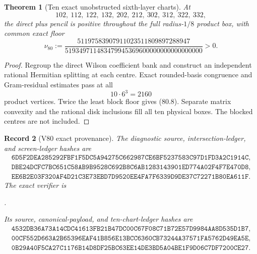 \documentclass[11pt,oneside]{article}
\newtheorem{theorem}{Theorem}[section]
\newtheorem{record}[theorem]{Record}
\theoremstyle{definition}
\theoremstyle{remark}
\begin{document}
\begin{theorem}[Ten exact unobstructed sixth-layer charts]
\label{thm:newv80-ten-charts}
At
\[
 102,\ 112,\ 122,\ 132,\ 202,\ 212,\
 302,\ 312,\ 322,\ 332,                                \tag{80.7}
\]
the direct plus pencil is positive throughout the full
radius-\(1/8\) product box, with common exact floor
\[
 \nu_{80}:=
 \frac{51197583907911023511809897288947}
 {519349711483479945369600000000000000000}>0.          \tag{80.8}
\]
\end{theorem}

\begin{proof}
Regroup the direct Wilson coefficient bank and construct an
independent rational Hermitian splitting at each centre.  Exact
rounded-basis congruence and Gram-residual estimates pass at all
\[
 10\cdot6^3=2160                                       \tag{80.9}
\]
product vertices.  Twice the least block floor gives (80.8).
Separate matrix convexity and the rational disk inclusions fill all
ten physical boxes.  The blocked centres are not included.
\end{proof}

\begin{record}[V80 exact provenance]
\label{rec:newv80-provenance}
The diagnostic source, intersection-ledger, and screen-ledger hashes
are
\[
\begin{gathered}
\texttt{6D5F2DEA285292FBF1F5DC5A94275C662987CE6BF5237583C97D1FD3A2C1914C},\\
\texttt{DBE24DCFC7BC651C58AB9B9528C692B8C6AB1283143901ED774A02F4F7E470D8},\\
\texttt{EE6B2E03F320AF4D21C3E73EBD7D9520EE4FA7F6339D9DE37C72271B80EA611F}.
\end{gathered}                                          \tag{80.10}
\]
The exact verifier is
\begin{center}\footnotesize
{}.
\end{center}
Its source, canonical-payload, and ten-chart-ledger hashes are
\[
\begin{gathered}
\texttt{4532DB36A73A14CDC41613FB21B47DC00C67F08C71B72E57D9984AA8D535D1B7},\\
\texttt{00CF552D663A2B65396EAF41B856E13BCC6360CB73244A37571FA5762D49EA5E},\\
\texttt{0B29A40F5CA27C1176B14D8DF25BC63EE14DE3BD5A04BE1F9D06C7DF7200CE27}.
\end{gathered}                                          \tag{80.11}
\]
\end{record}
\end{document}
